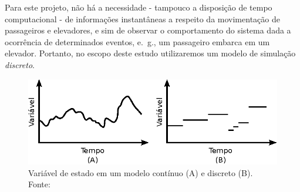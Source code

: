 \begin{enumerate}
Para este projeto, não há a necessidade - tampouco a disposição de tempo
computacional - de informações instantâneas a respeito da movimentação de
passageiros e elevadores, e sim de observar o comportamento do sistema dada a
ocorrência de determinados eventos, e.~g., um passageiro embarca em um elevador.
Portanto, no escopo deste estudo utilizaremos um modelo de simulação
\textit{discreto}.

\begin{figure}[htb!]
\centering\includegraphics{img/discrete_continuous.eps}
\caption{\label{fig:disccont}Variável de estado em um modelo contínuo (A) e discreto (B). Fonte:~\cite{Banks}}
\end{figure}

\end{enumerate}